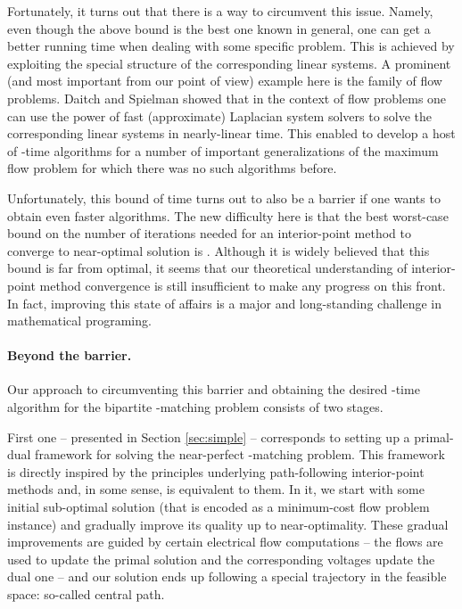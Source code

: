 \documentclass[11pt, letterpaper]{article}
\begin{document}
Fortunately, it turns out that there is a way to circumvent this issue. Namely, even though the above bound is the best one known in general, one can get a better running time when dealing with some specific problem. This is achieved by exploiting the special structure of the corresponding linear systems. A prominent (and most important from our point of view) example here is the family of flow problems. Daitch and Spielman \cite{DaitchS08} showed that in the context of flow problems one can use the power of fast (approximate) Laplacian system solvers \cite{SpielmanTeng04,KoutisMP10,KoutisMP11,KelnerOSZ13} to solve the corresponding linear systems in nearly-linear time. This enabled \cite{DaitchS08} to develop a host of -time algorithms for a number of important generalizations of the maximum flow problem for which there was no such algorithms before. 

Unfortunately, this bound of  time turns out to also be  a barrier if one wants to obtain even faster algorithms. The new difficulty here is that the best worst-case bound on the number of iterations needed for an interior-point method to converge to near-optimal solution is . Although it is widely believed that this bound is far from optimal, it seems that our theoretical understanding of interior-point method convergence is still insufficient to make any progress on this front. In fact,  improving this state of affairs is a major and long-standing challenge in mathematical programing. 

\paragraph{Beyond the  barrier.}  Our approach to circumventing this  barrier and obtaining the desired -time algorithm for the bipartite -matching problem consists of two stages.

First one -- presented in Section \ref{sec:simple} -- corresponds to setting up a primal-dual framework for solving the near-perfect -matching problem. This framework is directly inspired by the principles underlying path-following interior-point methods and, in some sense, is equivalent to them. In it, we start with some initial sub-optimal solution (that is encoded as a minimum-cost flow problem instance) and gradually improve its quality up to near-optimality. These gradual improvements are guided by certain electrical flow computations -- the flows are used to update the primal solution and the corresponding voltages update the dual one -- and our solution ends up following a special trajectory in the feasible space: so-called central path. 
\end{document}

